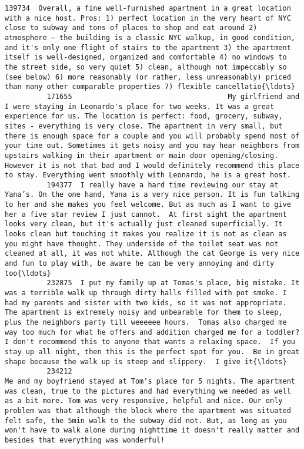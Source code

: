 \documentclass[11pt]{article}
\begin{document}
\begin{Verbatim}[commandchars=\\\{\}]
          139734  Overall, a fine well-furnished apartment in a great location with a nice host. Pros: 1) perfect location in the very heart of NYC close to subway and tons of places to shop and eat around 2) atmosphere – the building is a classic NYC walkup, in good condition, and it's only one flight of stairs to the apartment 3) the apartment itself is well-designed, organized and comfortable 4) no windows to the street side, so very quiet 5) clean, although not impeccably so (see below) 6) more reasonably (or rather, less unreasonably) priced than many other comparable properties 7) flexible cancellatio{\ldots}   
          171655                                     My girlfriend and I were staying in Leonardo's place for two weeks. It was a great experience for us. The location is perfect: food, grocery, subway, sites - everything is very close. The apartment in very small, but there is enough space for a couple and you will probably spend most of your time out. Sometimes it gets noisy and you may hear neighbors from upstairs walking in their apartment or main door opening/closing. However it is not that bad and I would definitely recommend this place to stay. Everything went smoothly with Leonardo, he is a great host.   
          194377  I really have a hard time reviewing our stay at Yana’s. On the one hand, Yana is a very nice person. It is fun talking to her and she makes you feel welcome. But as much as I want to give her a five star review I just cannot.  At first sight the apartment looks very clean, but it's actually just cleaned superficially. It looks clean but touching it makes you realize it is not as clean as you might have thought. They underside of the toilet seat was not cleaned at all, it was not white. Although the cat George is very nice and fun to play with, be aware he can be very annoying and dirty too{\ldots}   
          232875  I put my family up at Tomas's place, big mistake. It was a terrible walk up through dirty halls filled with pot smoke. I had my parents and sister with two kids, so it was not appropriate.  The apartment is extremely noisy and unbearable for them to sleep, plus the neighbors party till weeeeee hours.  Tomas also charged me way too much for what he offers and addition charged me for a toddler? I don't recommend this to anyone that wants a relaxing space.  If you stay up all night, then this is the perfect spot for you.  Be in great shape because the walk up is steep and slippery.  I give it{\ldots}   
          234212                                                                                                                                                     Me and my boyfriend stayed at Tom's place for 5 nights. The apartment was clean, true to the pictures and had everything we needed as well as a bit more. Tom was very responsive, helpful and nice. Our only problem was that although the block where the apartment was situated felt safe, the 5min walk to the subway did not. But, as long as you won't have to walk alone during nighttime it doesn't really matter and besides that everything was wonderful!   

\end{Verbatim}
\end{document}
